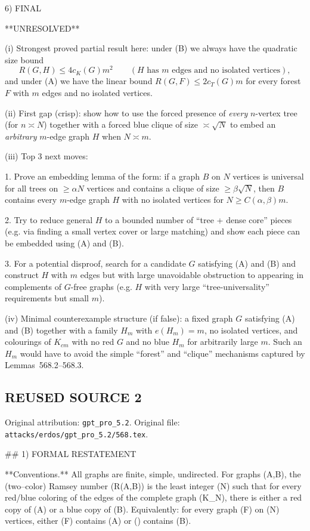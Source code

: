 6) FINAL

**UNRESOLVED**

(i) Strongest proved partial result here: under (B) we always have the quadratic size bound
\[
R(G,H)\le 4c_K(G)m^2\qquad (H\text{ has }m\text{ edges and no isolated vertices}),
\]
and under (A) we have the linear bound $R(G,F)\le 2c_T(G)m$ for every forest $F$ with $m$ edges and no isolated vertices.

(ii) First gap (crisp): show how to use the forced presence of \emph{every} $n$-vertex tree (for $n\asymp N$) together with a forced blue clique of size $\asymp\sqrt N$ to embed an \emph{arbitrary} $m$-edge graph $H$ when $N\asymp m$.

(iii) Top 3 next moves:

1. Prove an embedding lemma of the form: if a graph $B$ on $N$ vertices is universal for all trees on $\ge \alpha N$ vertices and contains a clique of size $\ge \beta\sqrt N$, then $B$ contains every $m$-edge graph $H$ with no isolated vertices for $N\ge C(\alpha,\beta)m$.

2. Try to reduce general $H$ to a bounded number of ``tree + dense core'' pieces (e.g. via finding a small vertex cover or large matching) and show each piece can be embedded using (A) and (B).

3. For a potential disproof, search for a candidate $G$ satisfying (A) and (B) and construct $H$ with $m$ edges but with large unavoidable obstruction to appearing in complements of $G$-free graphs (e.g. $H$ with very large ``tree-universality'' requirements but small $m$).

(iv) Minimal counterexample structure (if false): a fixed graph $G$ satisfying (A) and (B) together with a family $H_m$ with $e(H_m)=m$, no isolated vertices, and colourings of $K_{c m}$ with no red $G$ and no blue $H_m$ for arbitrarily large $m$. Such an $H_m$ would have to avoid the simple ``forest'' and ``clique'' mechanisms captured by Lemmas~568.2--568.3.




\subsection*{REUSED SOURCE 2}
Original attribution: \texttt{gpt\_pro\_5.2}.
Original file: \texttt{attacks/erdos/gpt\_pro\_5.2/568.tex}.

## 1) FORMAL RESTATEMENT

**Conventions.** All graphs are finite, simple, undirected.
For graphs (A,B), the (two–color) Ramsey number (R(A,B)) is the least integer (N) such that for every red/blue coloring of the edges of the complete graph (K_N), there is either a red copy of (A) or a blue copy of (B). Equivalently: for every graph (F) on (N) vertices, either (F) contains (A) or () contains (B).

